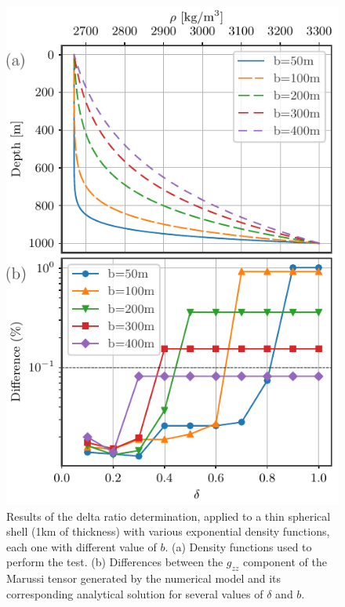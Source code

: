 \documentclass[extra]{gji}
\begin{document}
\begin{figure}
\centering
\includegraphics[width=0.9\linewidth]{figures/exponential-delta-thin.pdf}
\caption{
    Results of the delta ratio determination, applied to a thin spherical shell (1km of thickness) with various exponential density functions, each one with different value of $b$.
    (a) Density functions used to perform the test.
    (b) Differences between the $g_{zz}$ component of the Marussi tensor generated by the numerical model and its corresponding analytical solution for several values of $\delta$ and $b$.}
\label{fig:exponential-delta-thin}
\end{figure}
\end{document}

